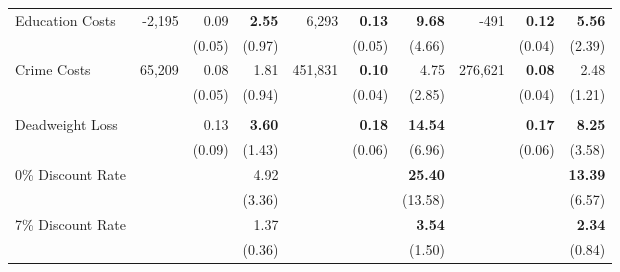 \begin{tabular}{l r r r r r r r r r}
Education Costs	&	-2,195	&	0.09	&	\textbf{2.55}	&	6,293	&	\textbf{0.13}	&	\textbf{9.68}	&	-491	&	\textbf{0.12}	&	\textbf{5.56}	\\
	&		&	(0.05)	&	(0.97)	&		&	(0.05)	&	(4.66)	&		&	(0.04)	&	(2.39)	\\
Crime Costs	&	65,209	&	0.08	&	1.81	&	451,831	&	\textbf{0.10}	&	4.75	&	276,621	&	\textbf{0.08}	&	2.48	\\
	&	&	(0.05)	&	(0.94)	&		&	(0.04)	&	(2.85)	&		&	(0.04)	&	(1.21)	\\ \\
Deadweight Loss	&		&	0.13	&	\textbf{3.60}	&		&	\textbf{0.18}	&	\textbf{14.54}	&		&	\textbf{0.17}	&	\textbf{8.25}	\\
	&		&	(0.09)	&	(1.43)	&		&	(0.06)	&	(6.96)	&		&	(0.06)	&	(3.58)	\\
0\% Discount Rate	&		&		&	4.92	&		&		&	\textbf{25.40}	&		&		&	\textbf{13.39}	\\
	&		&		&	(3.36)	&		&		&	(13.58)	&		&		&	(6.57)	\\
7\% Discount Rate	&		&		&	1.37	&		&		&	\textbf{3.54}	&		&		&	\textbf{2.34}	\\
	&		&		&	(0.36)	&		&		&	(1.50)	&		&		&	(0.84)	\\
\bottomrule																			
\end{tabular}																			
